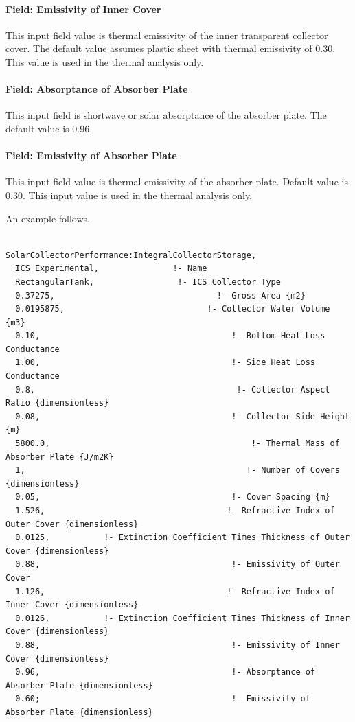 \paragraph{Field: Emissivity of Inner Cover}\label{field-emissivity-of-inner-cover}

This input field value is thermal emissivity of the inner transparent collector cover. The default value assumes plastic sheet with thermal emissivity of 0.30. This value is used in the thermal analysis only.

\paragraph{Field: Absorptance of Absorber Plate}\label{field-absorptance-of-absorber-plate}

This input field is shortwave or solar absorptance of the absorber plate. The default value is 0.96.

\paragraph{Field: Emissivity of Absorber Plate}\label{field-emissivity-of-absorber-plate}

This input field value is thermal emissivity of the absorber plate. Default value is 0.30. This input value is used in the thermal analysis only.

An example follows.

\begin{lstlisting}

SolarCollectorPerformance:IntegralCollectorStorage,
  ICS Experimental,               !- Name
  RectangularTank,                 !- ICS Collector Type
  0.37275,                                 !- Gross Area {m2}
  0.0195875,                             !- Collector Water Volume {m3}
  0.10,                                       !- Bottom Heat Loss Conductance
  1.00,                                       !- Side Heat Loss Conductance
  0.8,                                         !- Collector Aspect Ratio {dimensionless}
  0.08,                                       !- Collector Side Height {m}
  5800.0,                                         !- Thermal Mass of Absorber Plate {J/m2K}
  1,                                             !- Number of Covers {dimensionless}
  0.05,                                       !- Cover Spacing {m}
  1.526,                                     !- Refractive Index of Outer Cover {dimensionless}
  0.0125,           !- Extinction Coefficient Times Thickness of Outer Cover {dimensionless}
  0.88,                                       !- Emissivity of Outer Cover
  1.126,                                     !- Refractive Index of Inner Cover {dimensionless}
  0.0126,           !- Extinction Coefficient Times Thickness of Inner Cover {dimensionless}
  0.88,                                       !- Emissivity of Inner Cover {dimensionless}
  0.96,                                       !- Absorptance of Absorber Plate {dimensionless}
  0.60;                                       !- Emissivity of Absorber Plate {dimensionless}
\end{lstlisting}

